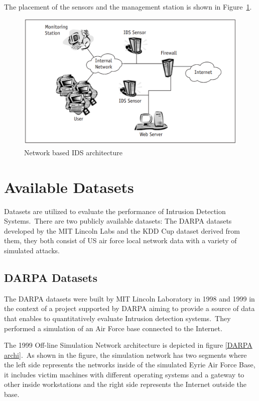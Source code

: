 \begin{enumerate}
							The placement of the sensors and the management station is shown in Figure~\ref{archi}.

							\begin{figure}[h!]
								\centering
								\includegraphics[scale=0.5]{figures/NIDS.PNG} 
								\caption{Network based IDS architecture \cite{guide}}
								\label{archi} 
							\end{figure}
					\end{enumerate}
		
		\section{Available Datasets} 

			Datasets are utilized to evaluate the performance of Intrusion Detection Systems.\ There are two publicly available datasets: The DARPA datasets developed by the MIT Lincoln Labs and the KDD Cup dataset derived from them, they both consist of US air force local network data with a variety of simulated attacks.

				\subsection{DARPA Datasets}
				
					The DARPA datasets were built by MIT Lincoln Laboratory in 1998 and 1999 in the context of a project supported by DARPA aiming to provide a source of data that enables to quantitatively evaluate Intrusion detection systems.\ They performed a simulation of an Air Force base connected to the Internet.

					The 1999 Off-line Simulation Network architecture is depicted in figure \ref{DARPA archi}.\ As shown in the figure, the simulation network has two segments where the left side represents the networks inside of the simulated Eyrie Air Force Base, it includes victim machines with different operating systems and a gateway to other inside workstations and the right side represents the Internet outside the base. 

